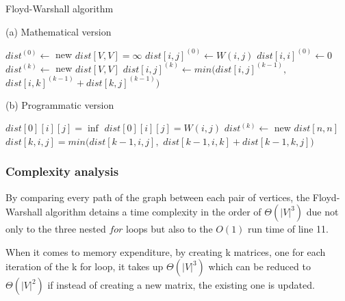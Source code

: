 \begin{algorithm}[ht]
    \caption{Floyd-Warshall algorithm}
    \label{alg:floyd-warshall}
    \begin{minipage}[t]{0.49\linewidth}
        (a) Mathematical version
        \begin{algorithmic}[1]
                    \State $dist^{(0)} \gets $ new $ dist[V, V] = \infty$
                        \State $dist[i,j]^{(0)} \gets W(i,j)$
                    \EndFor
                        \State $dist[i,i]^{(0)} \gets 0$
                    \EndFor
                    \State $dist^{(k)} \gets $ new $ dist[V, V]$
                            \State $dist[i,j]^{(k)} \gets min( dist[i,j]^{(k-1)},$
                            $dist[i,k]^{(k-1)} + dist[k,j]^{(k-1)} )$
                        \EndFor
                    \EndFor
                \EndFor
                \State {}
            \EndFunction
        \end{algorithmic}
    \end{minipage}
    \begin{minipage}[t]{0.49\linewidth}
        (b) Programmatic version
        \begin{algorithmic}[1]
                        \State $dist[0][i][j] = \inf$
                            \State $dist[0][i][j] = W(i,j)$
                        \EndIf
                    \EndFor
                \EndFor
                    \State $dist^{(k)} \gets $ new $ dist[n, n]$
                            \State $dist[k,i,j] = min(dist[k-1,i,j],$
                            $dist[k-1,i,k] + dist[k-1,k,j])$
                        \EndFor
                    \EndFor
                \EndFor
                \State {}
            \EndFunction
        \end{algorithmic}
    \end{minipage}
\end{algorithm}

\subsubsection{Complexity analysis}
By comparing every path of the graph between each pair of vertices, the Floyd-Warshall algorithm detains a time complexity in the order of $\Theta(|V|^3)$ due not only to the three nested $for$ loops but also to the $O(1)$ run time of line 11.\par
When it comes to memory expenditure, by creating k matrices, one for each iteration of the k for loop, it takes up $\Theta(|V|^3)$ which can be reduced to $\Theta(|V|^2)$ if instead of creating a new matrix, the existing one is updated.

